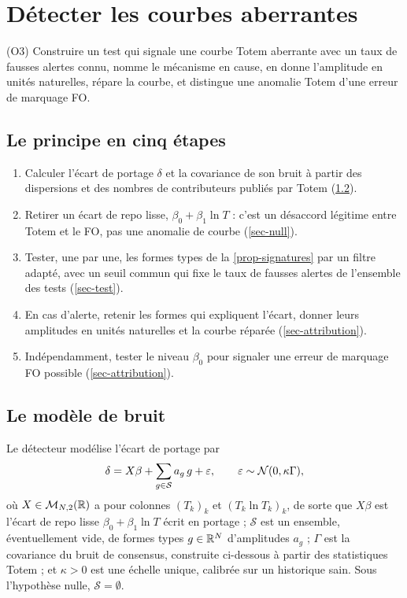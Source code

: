 \section{Détecter les courbes aberrantes}\label{sec-detection}

\begin{objectif}
(O3) Construire un test qui signale une courbe Totem aberrante avec un taux de fausses alertes connu, nomme le
mécanisme en cause, en donne l'amplitude en unités naturelles, répare la courbe, et distingue une anomalie Totem d'une
erreur de marquage FO.
\end{objectif}

\subsection{Le principe en cinq étapes}
\begin{enumerate}
\item Calculer l'écart de portage $\delta$ et la covariance de son bruit à partir des dispersions et des nombres de
contributeurs publiés par Totem (\cref{sec-noise}).
\item Retirer un écart de repo lisse, $\beta_0+\beta_1\ln T$ : c'est un désaccord légitime entre Totem et le FO, pas une
anomalie de courbe (\cref{sec-null}).
\item Tester, une par une, les formes types de la \cref{prop-signatures} par un filtre adapté, avec un seuil commun
qui fixe le taux de fausses alertes de l'ensemble des tests (\cref{sec-test}).
\item En cas d'alerte, retenir les formes qui expliquent l'écart, donner leurs amplitudes en unités naturelles et la
courbe réparée (\cref{sec-attribution}).
\item Indépendamment, tester le niveau $\beta_0$ pour signaler une erreur de marquage FO possible
(\cref{sec-attribution}).
\end{enumerate}

\subsection{Le modèle de bruit}\label{sec-noise}
\begin{definition}\label{def-obs}
Le détecteur modélise l'écart de portage par
\begin{equation}\label{eq-obs}
\delta=X\beta+\sum_{g\in\mathcal S}a_g\,g+\varepsilon, \qquad\varepsilon\sim\mathcal{N}(0, \kappa\Gamma),
\end{equation}
où $X\in\mathcal{M}_{N,2}(\mathbb{R})$ a pour colonnes $(T_k)_k$ et $(T_k\ln T_k)_k$, de sorte que $X\beta$ est l'écart de repo lisse
$\beta_0+\beta_1\ln T$ écrit en portage ; $\mathcal S$ est un ensemble, éventuellement vide, de formes types
$g\in\mathbb{R}^N$ d'amplitudes $a_g$ ; $\Gamma$ est la covariance du bruit de consensus, construite ci-dessous à partir des
statistiques Totem ; et $\kappa>0$ est une échelle unique, calibrée sur un historique sain. Sous l'hypothèse nulle,
$\mathcal S=\emptyset$.
\end{definition}

